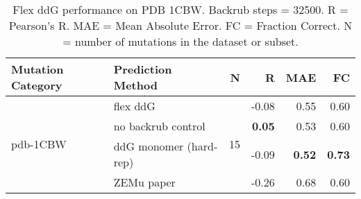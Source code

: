 \begin{table}
  \begin{tabular}{llrrrr}
\toprule
Mutation Category &       Prediction Method &   N &     R &  MAE &   FC \\
\midrule
 \multirow{ 4}{*}{pdb-1CBW} & flex ddG & \multirow{ 4}{*}{15} & -0.08 & 0.55 & 0.60  \\
 & no backrub control & & \textbf{0.05} & 0.53 & 0.60  \\
 & ddG monomer (hard-rep) & & -0.09 & \textbf{0.52} & \textbf{0.73}  \\
 & ZEMu paper & & -0.26 & 0.68 & 0.60  \\
\bottomrule
\end{tabular}
  \caption[Flex ddG performance on PDB 1CBW]{
    Flex ddG performance on PDB 1CBW. Backrub steps = 32500. R = Pearson's R. MAE = Mean Absolute Error. FC = Fraction Correct. N = number of mutations in the dataset or subset.
  } \label{tab:table-pdb-1CBW}
\end{table}
